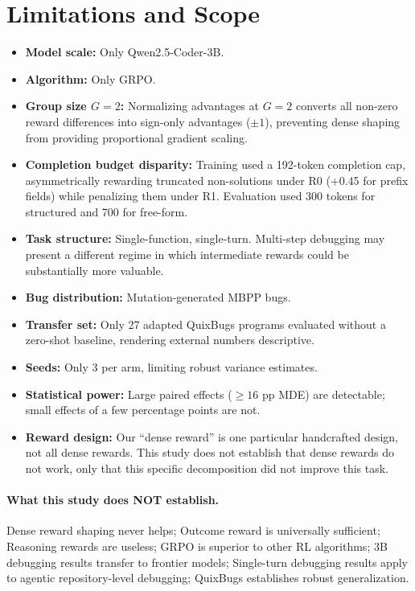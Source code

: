 \documentclass{article}
\begin{document}
\section{Limitations and Scope}
\begin{itemize}
\item \textbf{Model scale:} Only Qwen2.5-Coder-3B.
\item \textbf{Algorithm:} Only GRPO.
\item \textbf{Group size $G=2$:} Normalizing advantages at $G=2$ converts all non-zero reward differences into sign-only advantages ($\pm 1$), preventing dense shaping from providing proportional gradient scaling.
\item \textbf{Completion budget disparity:} Training used a 192-token completion cap, asymmetrically rewarding truncated non-solutions under R0 (+0.45 for prefix fields) while penalizing them under R1. Evaluation used 300 tokens for structured and 700 for free-form.
\item \textbf{Task structure:} Single-function, single-turn. Multi-step debugging may present a different regime in which intermediate rewards could be substantially more valuable.
\item \textbf{Bug distribution:} Mutation-generated MBPP bugs.
\item \textbf{Transfer set:} Only 27 adapted QuixBugs programs evaluated without a zero-shot baseline, rendering external numbers descriptive.
\item \textbf{Seeds:} Only 3 per arm, limiting robust variance estimates.
\item \textbf{Statistical power:} Large paired effects ($\ge 16$ pp MDE) are detectable; small effects of a few percentage points are not.
\item \textbf{Reward design:} Our ``dense reward'' is one particular handcrafted design, not all dense rewards. This study does not establish that dense rewards do not work, only that this specific decomposition did not improve this task.
\end{itemize}

\paragraph{What this study does NOT establish.}
Dense reward shaping never helps; Outcome reward is universally sufficient; Reasoning rewards are useless; GRPO is superior to other RL algorithms; 3B debugging results transfer to frontier models; Single-turn debugging results apply to agentic repository-level debugging; QuixBugs establishes robust generalization.
\end{document}
